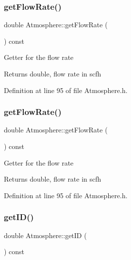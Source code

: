 \subsubsection{\texorpdfstring{get\+Flow\+Rate()}{getFlowRate()}\hspace{0.1cm}{\footnotesize\ttfamily [2/3]}}
{\footnotesize\ttfamily double Atmosphere\+::get\+Flow\+Rate (\begin{DoxyParamCaption}{ }\end{DoxyParamCaption}) const\hspace{0.3cm}{\ttfamily [inline]}}

Getter for the flow rate \begin{DoxyReturn}{Returns}
double, flow rate in scfh 
\end{DoxyReturn}


Definition at line 95 of file Atmosphere.\+h.

\mbox{\label{class_atmosphere_ad34708b12c8c9af4fce47669d68ebf4d}} 
\subsubsection{\texorpdfstring{get\+Flow\+Rate()}{getFlowRate()}\hspace{0.1cm}{\footnotesize\ttfamily [3/3]}}
{\footnotesize\ttfamily double Atmosphere\+::get\+Flow\+Rate (\begin{DoxyParamCaption}{ }\end{DoxyParamCaption}) const\hspace{0.3cm}{\ttfamily [inline]}}

Getter for the flow rate \begin{DoxyReturn}{Returns}
double, flow rate in scfh 
\end{DoxyReturn}


Definition at line 95 of file Atmosphere.\+h.

\mbox{\label{class_atmosphere_a4dfda799563c28438db1b23cbee6e099}} 
\subsubsection{\texorpdfstring{get\+I\+D()}{getID()}\hspace{0.1cm}{\footnotesize\ttfamily [1/3]}}
{\footnotesize\ttfamily double Atmosphere\+::get\+ID (\begin{DoxyParamCaption}{ }\end{DoxyParamCaption}) const\hspace{0.3cm}{\ttfamily [inline]}}

